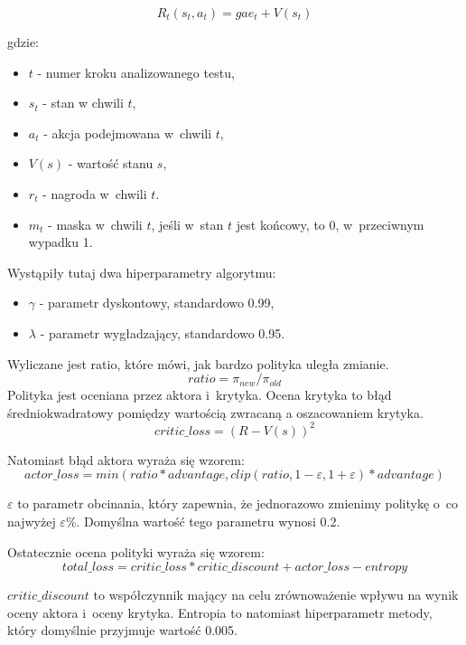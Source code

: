 \documentclass[a4paper,12pt]{article}
\begin{document}
\begin{equation}
	R_t(s_t,a_t) = gae_t + V(s_t)
\end{equation}

gdzie:
\begin{itemize}
	\item $t$ - numer kroku analizowanego testu,
	\item $s_t$ - stan w chwili $t$,
	\item $a_t$ - akcja podejmowana w~chwili $t$,
	\item $V(s)$ - wartość stanu $s$,
	\item $r_t$ - nagroda w~chwili $t$.
	\item $m_t$ - maska w~chwili $t$, jeśli w~stan $t$ jest końcowy, to 0, w~przeciwnym wypadku 1.
\end{itemize}

Wystąpiły tutaj dwa hiperparametry algorytmu:
\begin{itemize}
	\item $\gamma$ - parametr dyskontowy, standardowo 0.99,
	\item $\lambda$ - parametr wygładzający, standardowo 0.95.
\end{itemize}

Wyliczane jest ratio, które mówi, jak bardzo polityka uległa zmianie.
\begin{equation}
	ratio = \pi_{new} / \pi_{old}
\end{equation}
Polityka jest oceniana przez aktora i~krytyka. Ocena krytyka to błąd średniokwadratowy pomiędzy wartością zwracaną a oszacowaniem krytyka.
\begin{equation}
	critic\_loss = (R - V(s))^2
\end{equation}

Natomiast błąd aktora wyraża się wzorem:
\begin{equation}
	actor\_loss = min(ratio * advantage, clip(ratio, 1-\varepsilon,1+\varepsilon)* advantage)
\end{equation}

$\varepsilon$ to parametr obcinania, który zapewnia, że jednorazowo zmienimy politykę o~co najwyżej $\varepsilon\%$. Domyślna wartość tego parametru wynosi 0.2.

Ostatecznie ocena polityki wyraża się wzorem:
\begin{equation}
	total\_loss = critic\_loss * critic\_discount + actor\_loss - entropy
\end{equation}

$critic\_discount$ to współczynnik mający na celu zrównoważenie wpływu na wynik oceny aktora i~oceny krytyka. Entropia to natomiast hiperparametr metody, który domyślnie przyjmuje wartość 0.005. 
\end{document}
